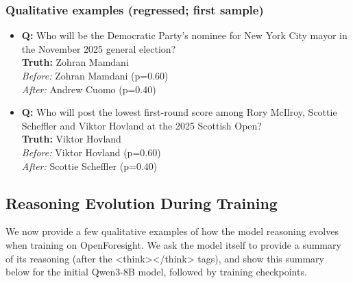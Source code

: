 \documentclass{article} %
\begin{document}
\subsubsection*{Qualitative examples (regressed; first sample)}
\begin{itemize}


\item \textbf{Q:} Who will be the Democratic Party's nominee for New York City mayor in the November 2025 general election? \\
\textbf{Truth:} Zohran Mamdani \\
\emph{Before:} Zohran Mamdani (p=0.60) \\
\emph{After:} Andrew Cuomo (p=0.40)

\item \textbf{Q:} Who will post the lowest first-round score among Rory McIlroy, Scottie Scheffler and Viktor Hovland at the 2025 Scottish Open? \\
\textbf{Truth:} Viktor Hovland \\
\emph{Before:} Viktor Hovland (p=0.60) \\
\emph{After:} Scottie Scheffler (p=0.40)
\end{itemize}

\subsection{Reasoning Evolution During Training}
\label{sec:reasoning_evolution}

We now provide a few qualitative examples of how the model reasoning evolves when training on OpenForesight. We ask the model itself to provide a summary of its reasoning (after the <think></think> tags), and show this summary below for the initial Qwen3-8B model, followed by training checkpoints.
\end{document}
